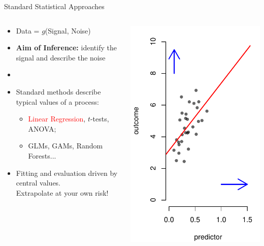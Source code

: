 \begin{frame}{Standard Statistical Approaches}
\begin{columns}
\begin{column}{0.5\textwidth}
    \begin{itemize}
        \item  Data = $g$(Signal, Noise)
        \item \textbf{Aim of Inference:} identify the signal and describe the noise
        \item []
        \item Standard methods describe typical values of a process:
        \begin{itemize}
            \item \textcolor{red}{Linear Regression}, $t$-tests, ANOVA;
            \item GLMs, GAMs, Random Forests...
        \end{itemize}
        \item Fitting and evaluation driven by central values. \\ {\color{blue} Extrapolate at your own risk!}
    \end{itemize}
\end{column}
\begin{column}{0.5\textwidth}
\centering
\includegraphics[height = 0.8\textheight]{linear_regression.pdf}

\end{column}
\end{columns}
\end{frame}
